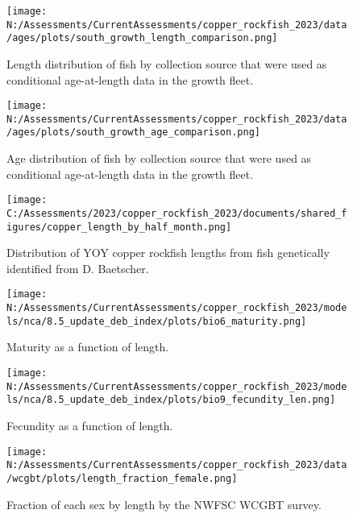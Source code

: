 \documentclass[11pt,
  english,
  letterpaper,
]{article}
\begin{document}
\begin{figure}
\centering
\texttt{[image: N:/Assessments/CurrentAssessments/copper\_rockfish\_2023/data/ages/plots/south\_growth\_length\_comparison.png]}
\caption{Length distribution of fish by collection source that were used as conditional age-at-length data in the growth fleet.\label{fig:growth-len-dist}}
\end{figure}

\begin{figure}
\centering
\texttt{[image: N:/Assessments/CurrentAssessments/copper\_rockfish\_2023/data/ages/plots/south\_growth\_age\_comparison.png]}
\caption{Age distribution of fish by collection source that were used as conditional age-at-length data in the growth fleet.\label{fig:growth-age-dist}}
\end{figure}

\begin{figure}
\centering
\texttt{[image: C:/Assessments/2023/copper\_rockfish\_2023/documents/shared\_figures/copper\_length\_by\_half\_month.png]}
\caption{Distribution of YOY copper rockfish lengths from fish genetically identified from D. Baetscher.\label{fig:copper-smurf-length}}
\end{figure}

\begin{figure}
\centering
\texttt{[image: N:/Assessments/CurrentAssessments/copper\_rockfish\_2023/models/nca/8.5\_update\_deb\_index/plots/bio6\_maturity.png]}
\caption{Maturity as a function of length.\label{fig:maturity}}
\end{figure}

\begin{figure}
\centering
\texttt{[image: N:/Assessments/CurrentAssessments/copper\_rockfish\_2023/models/nca/8.5\_update\_deb\_index/plots/bio9\_fecundity\_len.png]}
\caption{Fecundity as a function of length.\label{fig:fecundity}}
\end{figure}

\begin{figure}
\centering
\texttt{[image: N:/Assessments/CurrentAssessments/copper\_rockfish\_2023/data/wcgbt/plots/length\_fraction\_female.png]}
\caption{Fraction of each sex by length by the NWFSC WCGBT survey.\label{fig:frac-sex-len}}
\end{figure}
\end{document}
